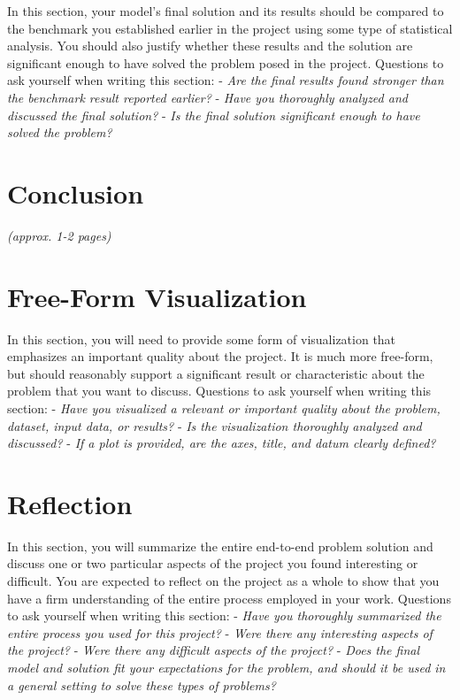 \documentclass[]{report}
\begin{document}
In this section, your model's final solution and its results should be
compared to the benchmark you established earlier in the project using
some type of statistical analysis. You should also justify whether these
results and the solution are significant enough to have solved the
problem posed in the project. Questions to ask yourself when writing
this section: - \emph{Are the final results found stronger than the
benchmark result reported earlier?} - \emph{Have you thoroughly analyzed
and discussed the final solution?} - \emph{Is the final solution
significant enough to have solved the problem?}

\chapter{Conclusion}

\emph{(approx. 1-2 pages)}

\chapter{Free-Form Visualization}\label{free-form-visualization}

In this section, you will need to provide some form of visualization
that emphasizes an important quality about the project. It is much more
free-form, but should reasonably support a significant result or
characteristic about the problem that you want to discuss. Questions to
ask yourself when writing this section: - \emph{Have you visualized a
relevant or important quality about the problem, dataset, input data, or
results?} - \emph{Is the visualization thoroughly analyzed and
discussed?} - \emph{If a plot is provided, are the axes, title, and
datum clearly defined?}

\chapter{Reflection}\label{reflection}

In this section, you will summarize the entire end-to-end problem
solution and discuss one or two particular aspects of the project you
found interesting or difficult. You are expected to reflect on the
project as a whole to show that you have a firm understanding of the
entire process employed in your work. Questions to ask yourself when
writing this section: - \emph{Have you thoroughly summarized the entire
process you used for this project?} - \emph{Were there any interesting
aspects of the project?} - \emph{Were there any difficult aspects of the
project?} - \emph{Does the final model and solution fit your
expectations for the problem, and should it be used in a general setting
to solve these types of problems?}
\end{document}
